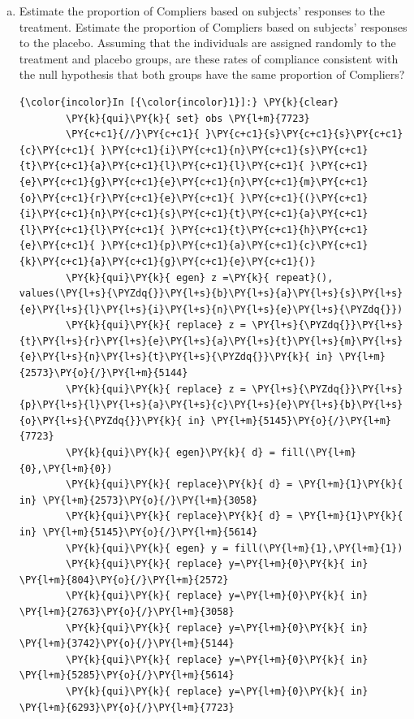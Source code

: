 \documentclass[11pt,notitlepage]{article}\usepackage[]{graphicx}\usepackage[]{color}
\makeatletter
\newenvironment{kframe}{%
 \def\at@end@of@kframe{}%
 \ifinner\ifhmode%
  \def\at@end@of@kframe{\end{minipage}}%
  \begin{minipage}{\columnwidth}%
 \fi\fi%
 \def\FrameCommand##1{\hskip\@totalleftmargin \hskip-\fboxsep
 \colorbox{shadecolor}{##1}\hskip-\fboxsep
     \hskip-\linewidth \hskip-\@totalleftmargin \hskip\columnwidth}%
 \MakeFramed {\advance\hsize-\width
   \@totalleftmargin\z@ \linewidth\hsize
   \@setminipage}}%
 {\par\unskip\endMakeFramed%
 \at@end@of@kframe}
\newenvironment{knitrout}{}{} %
\makeatother
\begin{document}
\begin{enumerate}[a)]
\item Estimate the proportion of Compliers based on subjects' responses to the treatment.
Estimate the proportion of Compliers based on subjects' responses to the placebo. Assuming that the individuals are assigned randomly to the treatment and placebo groups, are these rates of compliance consistent with the null hypothesis that both groups have the same proportion of Compliers? \\

\begin{knitrout}
\color{fgcolor}\begin{kframe}
   \begin{Verbatim}[commandchars=\\\{\}]
{\color{incolor}In [{\color{incolor}1}]:} \PY{k}{clear}
        \PY{k}{qui}\PY{k}{ set} obs \PY{l+m}{7723}
        \PY{c+c1}{//}\PY{c+c1}{ }\PY{c+c1}{s}\PY{c+c1}{s}\PY{c+c1}{c}\PY{c+c1}{ }\PY{c+c1}{i}\PY{c+c1}{n}\PY{c+c1}{s}\PY{c+c1}{t}\PY{c+c1}{a}\PY{c+c1}{l}\PY{c+c1}{l}\PY{c+c1}{ }\PY{c+c1}{e}\PY{c+c1}{g}\PY{c+c1}{e}\PY{c+c1}{n}\PY{c+c1}{m}\PY{c+c1}{o}\PY{c+c1}{r}\PY{c+c1}{e}\PY{c+c1}{ }\PY{c+c1}{(}\PY{c+c1}{i}\PY{c+c1}{n}\PY{c+c1}{s}\PY{c+c1}{t}\PY{c+c1}{a}\PY{c+c1}{l}\PY{c+c1}{l}\PY{c+c1}{ }\PY{c+c1}{t}\PY{c+c1}{h}\PY{c+c1}{e}\PY{c+c1}{ }\PY{c+c1}{p}\PY{c+c1}{a}\PY{c+c1}{c}\PY{c+c1}{k}\PY{c+c1}{a}\PY{c+c1}{g}\PY{c+c1}{e}\PY{c+c1}{)}
        \PY{k}{qui}\PY{k}{ egen} z =\PY{k}{ repeat}(), values(\PY{l+s}{\PYZdq{}}\PY{l+s}{b}\PY{l+s}{a}\PY{l+s}{s}\PY{l+s}{e}\PY{l+s}{l}\PY{l+s}{i}\PY{l+s}{n}\PY{l+s}{e}\PY{l+s}{\PYZdq{}})
        \PY{k}{qui}\PY{k}{ replace} z = \PY{l+s}{\PYZdq{}}\PY{l+s}{t}\PY{l+s}{r}\PY{l+s}{e}\PY{l+s}{a}\PY{l+s}{t}\PY{l+s}{m}\PY{l+s}{e}\PY{l+s}{n}\PY{l+s}{t}\PY{l+s}{\PYZdq{}}\PY{k}{ in} \PY{l+m}{2573}\PY{o}{/}\PY{l+m}{5144}
        \PY{k}{qui}\PY{k}{ replace} z = \PY{l+s}{\PYZdq{}}\PY{l+s}{p}\PY{l+s}{l}\PY{l+s}{a}\PY{l+s}{c}\PY{l+s}{e}\PY{l+s}{b}\PY{l+s}{o}\PY{l+s}{\PYZdq{}}\PY{k}{ in} \PY{l+m}{5145}\PY{o}{/}\PY{l+m}{7723}
        \PY{k}{qui}\PY{k}{ egen}\PY{k}{ d} = fill(\PY{l+m}{0},\PY{l+m}{0})
        \PY{k}{qui}\PY{k}{ replace}\PY{k}{ d} = \PY{l+m}{1}\PY{k}{ in} \PY{l+m}{2573}\PY{o}{/}\PY{l+m}{3058}
        \PY{k}{qui}\PY{k}{ replace}\PY{k}{ d} = \PY{l+m}{1}\PY{k}{ in} \PY{l+m}{5145}\PY{o}{/}\PY{l+m}{5614}
        \PY{k}{qui}\PY{k}{ egen} y = fill(\PY{l+m}{1},\PY{l+m}{1})
        \PY{k}{qui}\PY{k}{ replace} y=\PY{l+m}{0}\PY{k}{ in} \PY{l+m}{804}\PY{o}{/}\PY{l+m}{2572}
        \PY{k}{qui}\PY{k}{ replace} y=\PY{l+m}{0}\PY{k}{ in} \PY{l+m}{2763}\PY{o}{/}\PY{l+m}{3058}
        \PY{k}{qui}\PY{k}{ replace} y=\PY{l+m}{0}\PY{k}{ in} \PY{l+m}{3742}\PY{o}{/}\PY{l+m}{5144}
        \PY{k}{qui}\PY{k}{ replace} y=\PY{l+m}{0}\PY{k}{ in} \PY{l+m}{5285}\PY{o}{/}\PY{l+m}{5614}
        \PY{k}{qui}\PY{k}{ replace} y=\PY{l+m}{0}\PY{k}{ in} \PY{l+m}{6293}\PY{o}{/}\PY{l+m}{7723}
\end{Verbatim}


\end{kframe}
\end{knitrout}
\end{enumerate}
\end{document}
